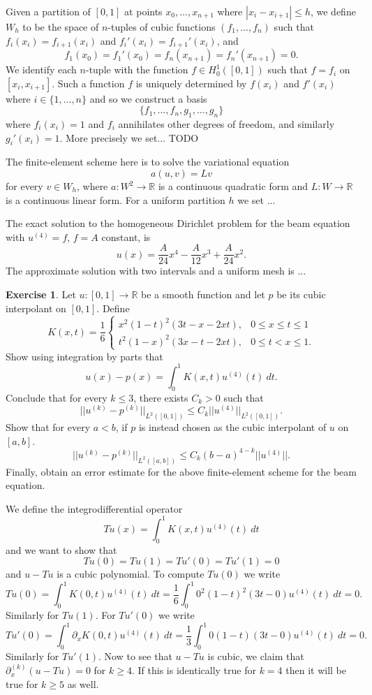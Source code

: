 \documentclass[10pt]{article}
\newcommand{\RR}{\mathbb{R}}
\theoremstyle{definition}
\newtheorem{exer}{Exercise}
\begin{document}
Given a partition of $[0, 1]$ at points $x_0, \dots, x_{n + 1}$ where $|x_i - x_{i + 1}| \leq h$, we define $W_h$ to be the space of $n$-tuples of cubic functions $(f_1, \dots, f_n)$ such that $f_i(x_i) = f_{i + 1}(x_i)$ and $f_i'(x_i) = f_{i + 1}'(x_i)$, and
$$f_1(x_0) = f_1'(x_0) = f_n(x_{n + 1}) = f_n'(x_{n + 1}) = 0.$$
We identify each $n$-tuple with the function $f \in H^1_0([0, 1])$ such that $f = f_i$ on $[x_i, x_{i + 1}]$.
Such a function $f$ is uniquely determined by $f(x_i)$ and $f'(x_i)$ where $i \in \{1, \dots, n\}$ and so we construct a basis
$$\{f_1, \dots, f_n, g_1, \dots, g_n\}$$
where $f_i(x_i) = 1$ and $f_i$ annihilates other degrees of freedom, and similarly $g_i'(x_i) = 1$.
More precisely we set... TODO

The finite-element scheme here is to solve the variational equation
$$a(u, v) = Lv$$
for every $v \in W_h$, where $a: W^2 \to \RR$ is a continuous quadratic form and $L: W \to \RR$ is a continuous linear form.
For a uniform partition $h$ we set ...

The exact solution to the homogeneous Dirichlet problem for the beam equation with $u^{(4)} = f$, $f = A$ constant, is
$$u(x) = \frac{A}{24}x^4 - \frac{A}{12}x^3 + \frac{A}{24}x^2.$$
The approximate solution with two intervals and a uniform mesh is ...

\begin{exer}
Let $u: [0, 1] \to \RR$ be a smooth function and let $p$ be its cubic interpolant on $[0, 1]$.
Define
$$K(x, t) = \frac{1}{6} \begin{cases} x^2 (1 - t)^2 (3t - x - 2xt), & 0 \leq x \leq t \leq 1 \\
t^2(1 - x)^2(3x - t - 2xt), & 0 \leq t < x \leq 1.
\end{cases}$$
Show using integration by parts that
$$u(x) - p(x) = \int_0^1 K(x, t) u^{(4)}(t) ~dt.$$
Conclude that for every $k \leq 3$, there exists $C_k > 0$ such that
$$||u^{(k)} - p^{(k)}||_{L^2([0, 1])} \leq C_k ||u^{(4)}||_{L^2([0, 1])}.$$
Show that for every $a < b$, if $p$ is instead chosen as the cubic interpolant of $u$ on $[a, b]$.
$$||u^{(k)} - p^{(k)}||_{L^2([a, b])} \leq C_k (b - a)^{4 - k} ||u^{(4)}||.$$
Finally, obtain an error estimate for the above finite-element scheme for the beam equation.
\end{exer}

We define the integrodifferential operator
$$Tu(x) = \int_0^1 K(x, t) u^{(4)}(t) ~dt$$
and we want to show that
$$Tu(0) = Tu(1) = Tu'(0) = Tu'(1) = 0$$
and $u - Tu$ is a cubic polynomial.
To compute $Tu(0)$ we write
$$Tu(0) = \int_0^1 K(0, t) u^{(4)}(t) ~dt = \frac{1}{6} \int_0^1 0^2 (1 - t)^2 (3t - 0) u^{(4)}(t) ~dt = 0.$$
Similarly for $Tu(1)$. For $Tu'(0)$ we write
$$Tu'(0) = \int_0^1 \partial_x K(0, t) u^{(4)}(t) ~dt = \frac{1}{3} \int_0^1 0(1 - t)(3t - 0) u^{(4)}(t) ~dt = 0.$$
Similarly for $Tu'(1)$.
Now to see that $u - Tu$ is cubic, we claim that $\partial_x^{(k)}(u - Tu) = 0$ for $k \geq 4$.
If this is identically true for $k = 4$ then it will be true for $k \geq 5$ as well.
\end{document}
